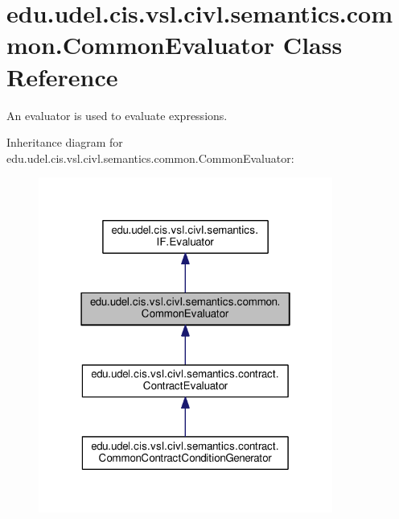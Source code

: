 \hypertarget{classedu_1_1udel_1_1cis_1_1vsl_1_1civl_1_1semantics_1_1common_1_1CommonEvaluator}{}\section{edu.\+udel.\+cis.\+vsl.\+civl.\+semantics.\+common.\+Common\+Evaluator Class Reference}
\label{classedu_1_1udel_1_1cis_1_1vsl_1_1civl_1_1semantics_1_1common_1_1CommonEvaluator}


An evaluator is used to evaluate expressions.  




Inheritance diagram for edu.\+udel.\+cis.\+vsl.\+civl.\+semantics.\+common.\+Common\+Evaluator\+:
\nopagebreak
\begin{figure}[H]
\begin{center}
\leavevmode
\includegraphics[width=274pt]{classedu_1_1udel_1_1cis_1_1vsl_1_1civl_1_1semantics_1_1common_1_1CommonEvaluator__inherit__graph}
\end{center}
\end{figure}


